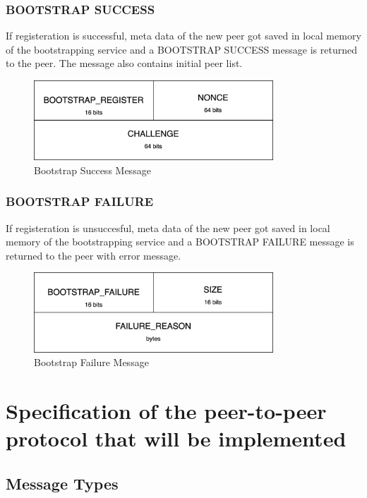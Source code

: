\subsubsection{BOOTSTRAP SUCCESS}

If registeration is successful, meta data of the new peer got saved in local memory of the bootstrapping service and a BOOTSTRAP SUCCESS message is returned to the peer. The message also contains initial peer list.

\begin{figure}[H]
    \centering
    \includegraphics[width=0.8\textwidth]{pics/bootstrap.success.png}
    \caption{Bootstrap Success Message}
\end{figure}

\subsubsection{BOOTSTRAP FAILURE}
If registeration is unsuccesful, meta data of the new peer got saved in local memory of the bootstrapping service and a BOOTSTRAP FAILURE message is returned to the peer with error message. 

\begin{figure}[H]
    \centering
    \includegraphics[width=0.8\textwidth]{pics/bootstrap.failure.png}
    \caption{Bootstrap Failure Message}
\end{figure}




\section{Specification of the peer-to-peer protocol that will be implemented}

\subsection{Message Types}

